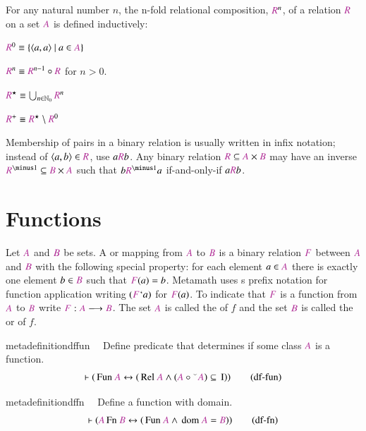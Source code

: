 \pn For any natural number $n$, the n-fold relational composition, $\mc{R}^{n}$, of a relation $\mc{R}$ on a set $ \mc{A}$ is defined inductively:

\(\mc{R}^{0} \equiv \{\langle a,a\rangle~\vert~ a\in  \mc{A}\}\)

\(\mc{R}^{n} \equiv \mc{R}^{n-1}\circ \mc{R}\)
for $n>0$.  

\(\mc{R}^\star \equiv \bigcup_{n\in \mathbb{N}_0} \mc{R}^{n}\)

\(\mc{R}^{+} \equiv \mc{R}^\star \setminus \mc{R}^{0}\)

\pn Membership of pairs in a binary relation is usually written in infix notation; instead of $\langle a,b\rangle\in \mc{R}$, use $a\mc{R}b$.
Any binary relation $\mc{R}\subseteq  \mc{A}\times  \mc{B}$ may have an inverse $\mc{R}^{\minus 1} \subseteq  \mc{B}\times  \mc{A}$ such that 
$b \mc{R}^{\minus 1}a$ if-and-only-if $a \mc{R} b$.

\section{Functions}\label{sec:functions}

\pn Let $\mc{A}$ and $\mc{B}$ be sets.  A  or mapping from $\mc{A}$ to $\mc{B}$ is a binary relation $\mc{F}$
between $\mc{A}$ and $\mc{B}$ with the following special property:  for each element $a\in \mc{A}$ there is exactly one element $b\in \mc{B}$ such that $\mc{F}(a)=b$.  
Metamath uses s prefix notation for function application writing $(\mc{F}`a)$ for $\mc{F}(a)$.
 To indicate that $\mc{F}$ is a 
function from $\mc{A}$ to $\mc{B}$ write \(\mc{F}:\mc{A}\longrightarrow \mc{B}\).    
The set $\mc{A}$ is called the  of $f$ and the set $\mc{B}$ is called the  or  of $f$.

\begin{restatable}{metadefinition}{dffun}~~ Define predicate that determines if some
class $\mc{A}$ is a function.
\begin{align}
\vdash ( \,\mathrm{Fun}~ \mc{A} \leftrightarrow ( \,\mathrm{Rel}~ \mc{A} \wedge (
    \mc{A} \circ {}^{\smallsmile} \mc{A} ) \subseteq \,\mathrm{I} )
    )\label{eq:df-fun}\tag{df-fun}
\end{align}
\end{restatable}

\begin{restatable}{metadefinition}{dffn}~~ Define a function with domain.  
\begin{align}
\vdash ( \mc{A} \,\mathrm{Fn}~ \mc{B} \leftrightarrow ( \,\mathrm{Fun}~ \mc{A}
    \wedge \,\mathrm{dom}~ \mc{A} = \mc{B} ) )\label{eq:df-fn}\tag{df-fn}
\end{align}
\end{restatable}

